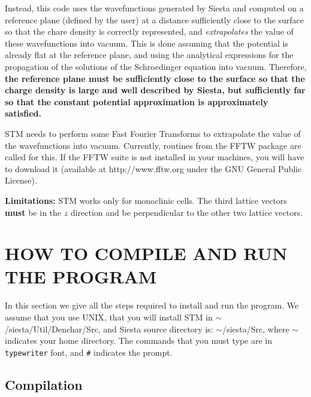 Instead, this code uses the wavefunctions generated by {\sc Siesta}
and computed on a reference plane (defined by the user)
at a distance sufficiently close to the surface so that the
chare density is correctly represented, and {\em extrapolates}
the value of these wavefunctions into vacuum. This is done assuming
that the potential is already flat at the reference plane,
and using the analytical expressions for the propagation of the
solutions of the Schroedinger equation into vacuum. Therefore, {\bf the
reference plane must be sufficiently close to the surface
so that the charge density is large and well described by {\sc Siesta},
but sufficiently far so that the constant potential approximation
is approximately satisfied.}

{\sc STM} needs to perform some Fast Fourier Transforms to
extrapolate the value of the wavefunctions into vacuum.
Currently, routines from the FFTW package are called for this.
If the FFTW suite is not installed in your machines, you
will have to download it (available at http://www.fftw.org
under the GNU General Public License).

\noindent
{\bf Limitations:} {\sc STM} works only for monoclinic cells.
The third lattice vectors {\bf must} be in the $z$ direction
and be perpendicular to the other two lattice vectors.

\section{HOW TO COMPILE AND RUN THE PROGRAM}

In this section we give all the steps required to install
and run the program. 
We assume that you use UNIX, that you will install {\sc STM} in 
$\sim$/siesta/Util/Denchar/Src, and {\sc Siesta} source directory is:
$\sim$/siesta/Src,
where $\sim$ indicates your home directory.
The commands that you must type are in {\tt typewriter} font, 
and {\tt \#} indicates the prompt.

\subsection{Compilation}

